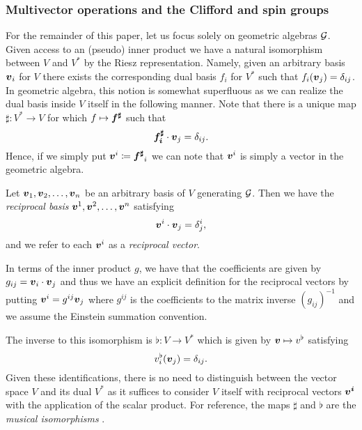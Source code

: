 \subsubsection{Multivector operations and the Clifford and spin groups}
\label{subsubsec:reverse_inverse_clifford_spin_groups}
For the remainder of this paper, let us focus solely on geometric algebras $\mathcal{G}$. Given access to an (pseudo) inner product we have a natural isomorphism between $V$ and $V^*$ by the Riesz representation.  Namely, given an arbitrary basis $\boldsymbol{v}_i$ for $V$ there exists the corresponding dual basis $f_i$ for $V^*$ such that $f_i(\boldsymbol{v}_j)=\delta_{ij}$. In geometric algebra, this notion is somewhat superfluous as we can realize the dual basis inside $V$ itself in the following manner. Note that there is a unique map $\sharp \colon V^* \to V$ for which $f\mapsto \boldsymbol{f^\sharp}$ such that
\begin{equation}
\boldsymbol{f_i^\sharp} \cdot \boldsymbol{v}_j = \delta_{ij}.
\end{equation}
Hence, if we simply put $\boldsymbol{v}^i \coloneqq \boldsymbol{f^\sharp}_i$ we can note that $\boldsymbol{v}^i$ is simply a vector in the geometric algebra.
\begin{definition}
Let $\boldsymbol{v}_1,\boldsymbol{v}_2,\dots,\boldsymbol{v}_n$ be an arbitrary basis of $V$ generating $\mathcal{G}$. Then we have the \emph{reciprocal basis} $\boldsymbol{v}^1,\boldsymbol{v}^2,\dots,\boldsymbol{v}^n$ satisfying
\begin{equation}
    \boldsymbol{v}^i\cdot \boldsymbol{v}_j = \delta^i_j,
\end{equation}
and we refer to each $\boldsymbol{v}^i$ as a \emph{reciprocal vector}.
\end{definition}
In terms of the inner product $g$, we have that the coefficients are given by $g_{ij}=\boldsymbol{v}_i\cdot \boldsymbol{v}_j$ and thus we have an explicit definition for the reciprocal vectors by putting $\boldsymbol{v}^i = g^{ij}\boldsymbol{v}_j$ where $g^{ij}$ is the coefficients to the matrix inverse $(g_{ij})^{-1}$ and we assume the Einstein summation convention. 

The inverse to this isomorphism is $\flat \colon V \to V^*$ which is given by $\boldsymbol{v} \mapsto v^\flat$ satisfying
\begin{equation}
v_i^\flat (\boldsymbol{v}_j)= \delta_{ij}.
\end{equation}
Given these identifications, there is no need to distinguish between the vector space $V$ and its dual $V^*$ as it suffices to consider $V$ itself with reciprocal vectors $\boldsymbol{v^i}$ with the application of the scalar product. For reference, the maps $\sharp$ and $\flat$ are the \emph{musical isomorphisms} .

